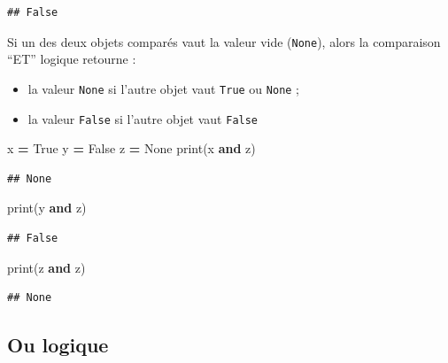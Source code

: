 \documentclass[12pt,]{book}
\newenvironment{Shaded}{\begin{snugshade}}{\end{snugshade}}
\newcommand{\KeywordTok}[1]{\textcolor[rgb]{0.13,0.29,0.53}{\textbf{#1}}}
\newcommand{\VariableTok}[1]{\textcolor[rgb]{0.00,0.00,0.00}{#1}}
\newcommand{\OperatorTok}[1]{\textcolor[rgb]{0.81,0.36,0.00}{\textbf{#1}}}
\newcommand{\BuiltInTok}[1]{#1}
\newcommand{\NormalTok}[1]{#1}
\providecommand{\tightlist}{%
  \setlength{\itemsep}{0pt}\setlength{\parskip}{0pt}}
\numberwithin{equation}{section}
\numberwithin{countremarque}{section}
\begin{document}
\begin{lstlisting}
## False
\end{lstlisting}

Si un des deux objets comparés vaut la valeur vide (\texttt{None}),
alors la comparaison ``ET'' logique retourne :

\begin{itemize}
\tightlist
\item
  la valeur \texttt{None} si l'autre objet vaut \texttt{True} ou
  \texttt{None} ;
\item
  la valeur \texttt{False} si l'autre objet vaut \texttt{False}
\end{itemize}

\begin{Shaded}
\begin{Highlighting}[]
\NormalTok{x }\OperatorTok{=} \VariableTok{True}
\NormalTok{y }\OperatorTok{=} \VariableTok{False}
\NormalTok{z }\OperatorTok{=} \VariableTok{None}
\BuiltInTok{print}\NormalTok{(x }\KeywordTok{and}\NormalTok{ z)}
\end{Highlighting}
\end{Shaded}

\begin{lstlisting}
## None
\end{lstlisting}

\begin{Shaded}
\begin{Highlighting}[]
\BuiltInTok{print}\NormalTok{(y }\KeywordTok{and}\NormalTok{ z)}
\end{Highlighting}
\end{Shaded}

\begin{lstlisting}
## False
\end{lstlisting}

\begin{Shaded}
\begin{Highlighting}[]
\BuiltInTok{print}\NormalTok{(z }\KeywordTok{and}\NormalTok{ z)}
\end{Highlighting}
\end{Shaded}

\begin{lstlisting}
## None
\end{lstlisting}

\subsection{Ou logique}\label{ou-logique}
\end{document}
